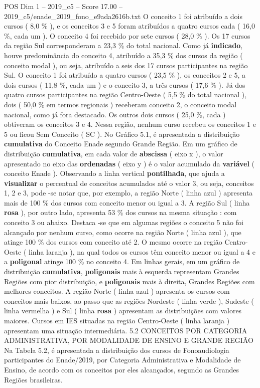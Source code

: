 \begin{textsample}{POS Dim 1 – 2019\_c5 – Score 17.00 – 2019\_c5/enade\_2019\_fono\_e9ada2616b.txt}
O conceito 1 foi atribuído a dois cursos ( 8,0 \% ), e os conceitos 3 e 5 foram atribuídos a quatro cursos cada ( 16,0 \%, cada um ).
O conceito 4 foi recebido por sete cursos ( 28,0 \% ).
Os 17 cursos da região Sul corresponderam a 23,3 \% do total nacional.
Como já \textbf{indicado}, houve predominância do conceito 4, atribuído a 35,3 \% dos cursos da região ( conceito modal ), ou seja, atribuído a seis dos 17 cursos participantes na região Sul.
O conceito 1 foi atribuído a quatro cursos ( 23,5 \% ), os conceitos 2 e 5, a dois cursos ( 11,8 \%, cada um ) e o conceito 3, a três cursos ( 17,6 \% ).
Já dos quatro cursos participantes na região Centro-Oeste ( 5,5 \% do total nacional ), dois ( 50,0 \% em termos regionais ) receberam conceito 2, o conceito modal nacional, como já fora destacado.
Os outros dois cursos ( 25,0 \%, cada ) obtiveram os conceitos 3 e 4.
Nessa região, nenhum curso recebeu os conceitos 1 e 5 ou ficou Sem Conceito ( SC ).
No Gráfico 5.1, é apresentada a distribuição \textbf{cumulativa} do Conceito Enade segundo Grande Região.
Em um gráfico de distribuição \textbf{cumulativa}, em cada valor de \textbf{abscissa} ( eixo x ), o valor apresentado no eixo das \textbf{ordenadas} ( eixo y ) é o valor acumulado da \textbf{variável} ( conceito Enade ).
Observando a linha vertical \textbf{pontilhada}, que ajuda a \textbf{visualizar} o percentual de conceitos acumulados até o valor 3, ou seja, conceitos 1, 2 e 3, pode -se notar que, por exemplo, a região Norte ( linha azul ) apresenta mais de 100 \% dos cursos com conceito menor ou igual a 3.
A região Sul ( linha \textbf{rosa} ), por outro lado, apresenta 53 \% dos cursos na mesma situação : com conceito 3 ou abaixo.
Destaca -se que em algumas regiões o conceito 5 não foi alcançado por nenhum curso, como ocorre na região Norte ( linha azul ), que atinge 100 \% dos cursos com conceito até 2.
O mesmo ocorre na região Centro-Oeste ( linha laranja ), na qual todos os cursos têm conceito menor ou igual a 4 e a \textbf{poligonal} atinge 100 \% no conceito 4.
Em linhas gerais, em um gráfico de distribuição \textbf{cumulativa}, \textbf{poligonais} mais à esquerda representam Grandes Regiões com pior distribuição, e \textbf{poligonais} mais à direita, Grandes Regiões com melhores conceitos.
A região Norte ( linha azul ) apresenta os cursos com conceitos mais baixos, ao passo que as regiões Nordeste ( linha verde ), Sudeste ( linha vermelha ) e Sul ( linha \textbf{rosa} ) apresentam as distribuições com valores maiores.
Cursos em IES situadas na região Centro-Oeste ( linha laranja ) apresentam uma situação intermediária. 5.2 CONCEITOS POR CATEGORIA ADMINISTRATIVA, POR MODALIDADE DE ENSINO E GRANDE REGIÃO Na Tabela 5.2, é apresentada a distribuição dos cursos de Fonoaudiologia participantes do Enade/2019, por Categoria Administrativa e Modalidade de Ensino, de acordo com os conceitos por eles alcançados, segundo as Grandes Regiões brasileiras.

\end{textsample}
